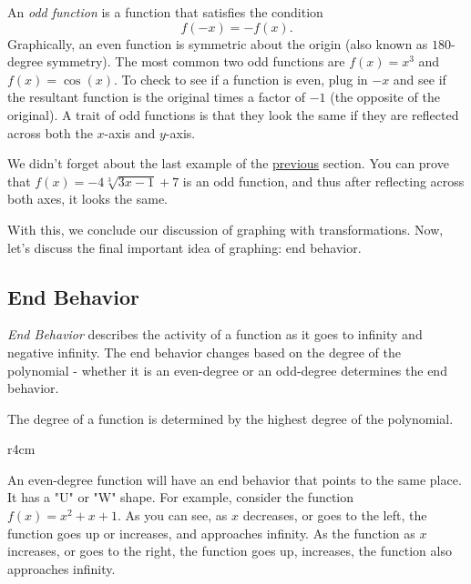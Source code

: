 \documentclass[../book.tex]{subfiles}
\begin{document}
An \textit{odd function} is a function that satisfies the condition $$f(-x)=-f(x).$$  Graphically, an even function is symmetric about the origin (also known as $180$-degree symmetry).  The most common two odd functions are $f(x)=x^3$ and $f(x)=\cos(x)$.  To check to see if a function is even, plug in $-x$ and see if the resultant function is the original times a factor of $-1$ (the opposite of the original).  A trait of odd functions is that they look the same if they are reflected across both the $x$-axis and $y$-axis.

We didn't forget about the last example of the \hyperlink{section.2.4.1}{previous} section.  You can prove that $f(x)=-4\sqrt[3]{3x-1}+7$ is an odd function, and thus after reflecting across both axes, it looks the same.

With this, we conclude our discussion of graphing with transformations.  Now, let's discuss the final important idea of graphing: end behavior.
\subsection{End Behavior}
\noindent \textit{End Behavior} describes the activity of a function as it goes to infinity and negative infinity.  The end behavior changes based on the degree of the polynomial - whether it is an even-degree or an odd-degree determines the end behavior.

\begin{remark}
  The degree of a function is determined by the highest degree of the polynomial.
\end{remark}

\begin{wrapfigure}{r}{4cm}
    \centering
\end{wrapfigure}
An even-degree function will have an end behavior that points to the same place.  It has a "U" or "W" shape.  For example, consider the function $f(x)=x^2+x+1$.  As you can see, as $x$ decreases, or goes to the left, the function goes up or increases, and approaches infinity.  As the function as $x$ increases, or goes to the right, the function goes up, increases, the function also approaches infinity.
\end{document}
